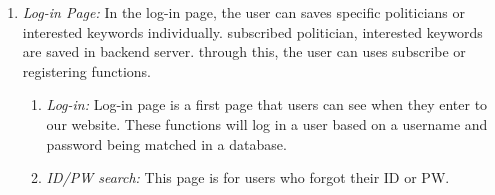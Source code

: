 \documentclass[conference]{IEEEtran}
\begin{document}
\begin{enumerate}
	\item \textit {Log-in Page:} 
In the log-in page, the user can saves specific politicians or interested keywords individually. subscribed politician, interested keywords are saved in backend server. through this, the user can uses subscribe or registering functions.\\
    \begin{enumerate}
    	\item \textit {Log-in:} Log-in page is a first page that users can see when they enter to our website. These functions will log in a user based on a username and password being matched in a database.\\
        \item \textit {ID/PW search:} This page is for users who forgot their ID or PW.\\
    \end{enumerate}
    

\end{enumerate}
\end{document}
